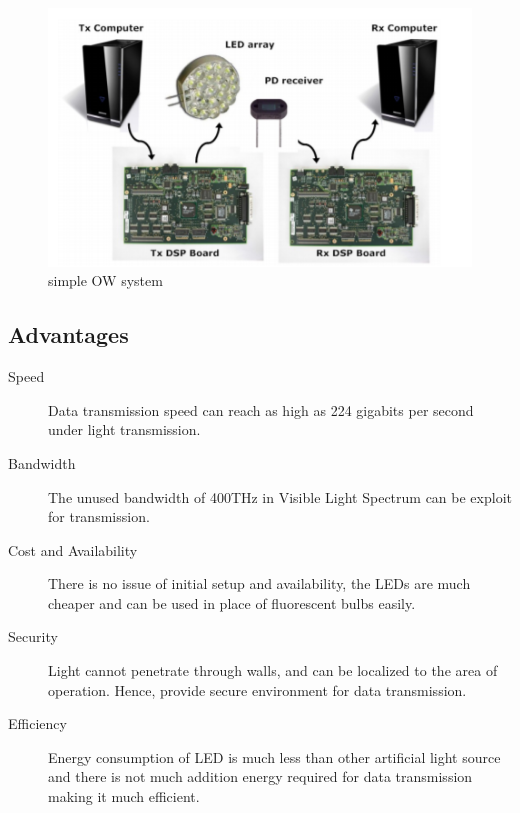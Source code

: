 \documentclass{article}
\begin{document}
\begin{figure}[!h]
  \includegraphics[width=\linewidth]{res/hardware_li_fi.PNG}
    \caption{simple OW system {\cite{hardware}}}
  \label{fig:hardware_li_fi}
\end{figure}




\subsection{Advantages}

\begin{description}
    
    \item [Speed] Data transmission speed can reach as high as 224 gigabits per second under light transmission.

    \item [Bandwidth] The unused bandwidth of 400THz in Visible Light Spectrum can be exploit for transmission. 

    \item [Cost and Availability]  There is no issue of initial setup and availability, the LEDs are much cheaper and can be used in place of fluorescent bulbs easily.
    
    \item [Security]  Light cannot penetrate through walls, and can be localized to the area of operation. Hence, provide secure environment for data transmission.
    
    \item [Efficiency] Energy consumption of LED is much less than other artificial light source and there is not much addition energy required for data transmission making it much efficient.
    
\end{description}
\end{document}
